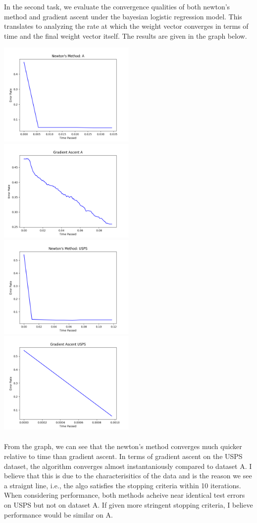\documentclass{article}
\begin{document}
In the second task, we evaluate the convergence qualities of both newton's method and gradient ascent under the bayesian logistic regression model. This translates to analyzing the rate at which the weight vector converges in terms of time and the final weight vector itself. The results are given in the graph below.

\includegraphics[width=0.5\textwidth]{../output/newton-A.png}
\includegraphics[width=0.5\textwidth]{../output/gradient-A.png}
\includegraphics[width=0.5\textwidth]{../output/newton-USPS.png}
\includegraphics[width=0.5\textwidth]{../output/gradient-USPS.png}
\\ \\
From the graph, we can see that the newton's method converges much quicker relative to time than gradient ascent. In terms of gradient ascent on the USPS dataset, the algorithm converges almost instantaniously compared to dataset A. I believe that this is due to the characterisitics of the data and is the reason we see a straignt line, i.e., the algo satisfies the stopping criteria within 10 iterations. When considering performance, both methods acheive near identical test errors on USPS but not on dataset A. If given more stringent stopping criteria, I believe performance would be similar on A.
\end{document}
